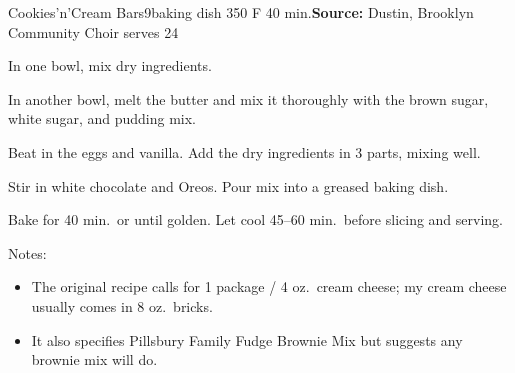 \begin{recipe}{Cookies'n'Cream Bars}{9\inch{}\inch baking dish \hfill 350\0 F \hfill 40 min.}{\textbf{Source:} Dustin, Brooklyn Community Choir \hfill serves 24}

 In one bowl, mix dry ingredients.

 In another bowl, melt the butter and mix it thoroughly with the brown sugar, white sugar, and pudding mix.

 Beat in the eggs and vanilla. Add the dry ingredients in 3 parts, mixing well.

 Stir in white chocolate and Oreos. Pour mix into a greased baking dish.

 \newstep Bake for 40 min.\ or until golden. Let cool 45--60 min.\ before slicing and serving.

 \freeform Notes:
 \begin{itemize}
  \item The original recipe calls for 1 package / 4 oz.\ cream cheese; my cream cheese usually comes in 8 oz.\ bricks.
  \item It also specifies Pillsbury Family Fudge Brownie Mix but suggests any brownie mix will do.
 \end{itemize}
\end{recipe}
